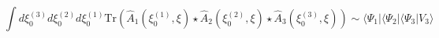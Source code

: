 \begin{equation}
\int d\xi _{0}^{(3)}d\xi _{0}^{(2)}d\xi _{0}^{(1)}\mathrm{Tr}(\hat{A}_1
(\xi _{0}^{(1)},\xi )\star \hat{A}_2(\xi _{0}^{(2)},\xi )\star 
\hat{A}_3(\xi _{0}^{(3)},\xi ))\sim \langle \Psi_1|
\langle \Psi_2|\langle \Psi_3|V_{3}\rangle
\end{equation}

